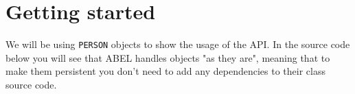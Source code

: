 \documentclass[a4paper,12pt]{report}
\begin{document}

\section{Getting started}
We will be using \lstinline!PERSON! objects to show the usage of the API. 
In the source code below you will see that ABEL handles objects "as they are", meaning that to make them persistent you don't need to add any dependencies to their class source code.
\end{document}
